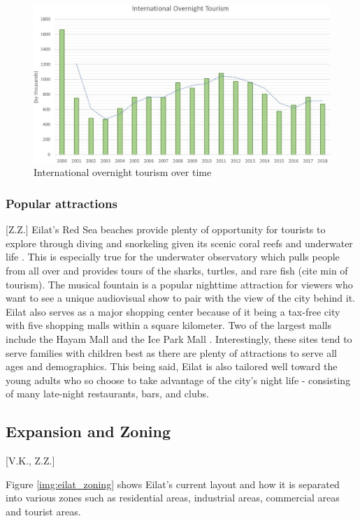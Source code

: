 \documentclass[12pt]{article}                       %
\begin{document}
\begin{figure}[H]
    \centering
    \includegraphics[width=12cm]{images/international_overnight_tourism.jpeg}
    \caption{International overnight tourism over time}
    \label{img:international_overnight_tourism}
\end{figure}

\subsubsection{Popular attractions}[Z.Z.]
Eilat's Red Sea beaches provide plenty of opportunity for tourists to explore through diving and snorkeling given its scenic coral reefs and underwater life \cite{Benner2017UpgradingEilat}. This is especially true for the underwater observatory which pulls people from all over and provides tours of the sharks, turtles, and rare fish (cite min of tourism). The musical fountain is a popular nighttime attraction for viewers who want to see a unique audiovisual show to pair with the view of the city behind it. Eilat also serves as a major shopping center because of it being a tax-free city with five shopping malls within a square kilometer. Two of the largest malls include the Hayam Mall and the Ice Park Mall \cite{Benner2017UpgradingEilat}. Interestingly, these sites tend to serve families with children best as there are plenty of attractions to serve all ages and demographics. This being said, Eilat is also tailored well toward the young adults who so choose to take advantage of the city's night life - consisting of many late-night restaurants, bars, and clubs.

\subsection{Expansion and Zoning}[V.K., Z.Z.]

Figure \ref{img:eilat_zoning} shows Eilat's current layout and how it is separated into various zones such as residential areas, industrial areas, commercial areas and tourist areas. 
\end{document}
